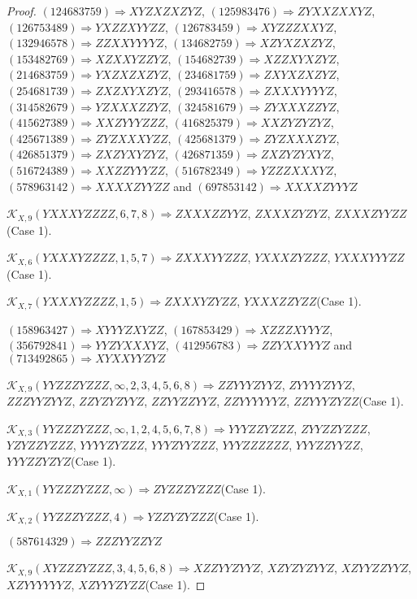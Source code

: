 \documentclass[12pt]{article}
\theoremstyle{plain}
\theoremstyle{definition}
\theoremstyle{remark}
\newcommand{\fancy}[1]{\mathcal{#1}}
\def\K{\fancy{K}}
\begin{document}
\begin{proof}
	$(1 2 4 6 8 3 7 5 9)\Rightarrow XYZXZXZYZ$, $(1 2 5 9 8 3 4 7 6)\Rightarrow ZYXXZXXYZ$, $(1 2 6 7 5 3 4 8 9)\Rightarrow YXZZXYYZZ$, $(1 2 6 7 8 3 4 5 9)\Rightarrow XYZZZXXYZ$, $(1 3 2 9 4 6 5 7 8)\Rightarrow ZZXXYYYYZ$, $(1 3 4 6 8 2 7 5 9)\Rightarrow XZYXZXZYZ$, $(1 5 3 4 8 2 7 6 9)\Rightarrow XZXXYZZYZ$, $(1 5 4 6 8 2 7 3 9)\Rightarrow XZZXYXZYZ$, $(2 1 4 6 8 3 7 5 9)\Rightarrow YXZXZXZYZ$, $(2 3 4 6 8 1 7 5 9)\Rightarrow ZXYXZXZYZ$, $(2 5 4 6 8 1 7 3 9)\Rightarrow ZXZXYXZYZ$, $(2 9 3 4 1 6 5 7 8)\Rightarrow ZXXXYYYYZ$, $(3 1 4 5 8 2 6 7 9)\Rightarrow YZXXXZZYZ$, $(3 2 4 5 8 1 6 7 9)\Rightarrow ZYXXXZZYZ$, $(4 1 5 6 2 7 3 8 9)\Rightarrow XXZYYYZZZ$, $(4 1 6 8 2 5 3 7 9)\Rightarrow XXZYZYZYZ$, $(4 2 5 6 7 1 3 8 9)\Rightarrow ZYZXXXYZZ$, $(4 2 5 6 8 1 3 7 9)\Rightarrow ZYZXXXZYZ$, $(4 2 6 8 5 1 3 7 9)\Rightarrow ZXZYXYZYZ$, $(4 2 6 8 7 1 3 5 9)\Rightarrow ZXZYZYXYZ$, $(5 1 6 7 2 4 3 8 9)\Rightarrow XXZZYYYZZ$, $(5 1 6 7 8 2 3 4 9)\Rightarrow YZZZXXXYZ$, $(5 7 8 9 6 3 1 4 2)\Rightarrow XXXXZYYZZ$ and $(6 9 7 8 5 3 1 4 2)\Rightarrow XXXXZYYYZ$
	
	
	$\K_{X,9}(YXXXYZZZZ,6, 7, 8)\Rightarrow $$ZXXXZZYYZ$, $ZXXXZYZYZ$, $ZXXXZYYZZ$(Case 1).
	
	$\K_{X,6}(YXXXYZZZZ,1, 5, 7)\Rightarrow $$ZXXXYYZZZ$, $YXXXZYZZZ$, $YXXXYYYZZ$(Case 1).
	
	$\K_{X,7}(YXXXYZZZZ,1, 5)\Rightarrow $$ZXXXYZYZZ$, $YXXXZZYZZ$(Case 1).
	
	
	
	$(1 5 8 9 6 3 4 2 7)\Rightarrow XYYYZXYZZ$, $(1 6 7 8 5 3 4 2 9)\Rightarrow XZZZXYYYZ$, $(3 5 6 7 9 2 8 4 1)\Rightarrow YYZYXXXYZ$, $(4 1 2 9 5 6 7 8 3)\Rightarrow ZZYXXYYYZ$ and $(7 1 3 4 9 2 8 6 5)\Rightarrow XYXXYYZYZ$
	
	
	$\K_{X,9}(YYZZZYZZZ,\infty,2, 3, 4, 5, 6, 8)\Rightarrow $$ZZYYYZYYZ$, $ZYYYYZYYZ$, $ZZZYYZYYZ$, $ZZYZYZYYZ$, $ZZYYZZYYZ$, $ZZYYYYYYZ$, $ZZYYYZYZZ$(Case 1).
	
	$\K_{X,3}(YYZZZYZZZ,\infty,1, 2, 4, 5, 6, 7, 8)\Rightarrow $$YYYZZYZZZ$, $ZYYZZYZZZ$, $YZYZZYZZZ$, $YYYYZYZZZ$, $YYYZYYZZZ$, $YYYZZZZZZ$, $YYYZZYYZZ$, $YYYZZYZYZ$(Case 1).
	
	$\K_{X,1}(YYZZZYZZZ,\infty)\Rightarrow $$ZYZZZYZZZ$(Case 1).
	
	$\K_{X,2}(YYZZZYZZZ,4)\Rightarrow $$YZZYZYZZZ$(Case 1).
	
	
	
	$(5 8 7 6 1 4 3 2 9)\Rightarrow ZZZYYZZYZ$
	
	
	$\K_{X,9}(XYZZZYZZZ,3, 4, 5, 6, 8)\Rightarrow $$XZZYYZYYZ$, $XZYZYZYYZ$, $XZYYZZYYZ$, $XZYYYYYYZ$, $XZYYYZYZZ$(Case 1).
	

\end{proof}
\end{document}
